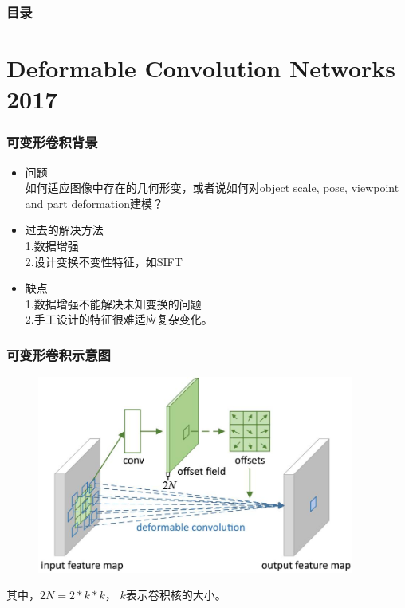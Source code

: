 \documentclass{beamer}
\date{2018 04}
\begin{document}
        \begin{frame}
            \frametitle{目录}
            \tableofcontents
        \end{frame}
        \section{Deformable Convolution Networks 2017}
        \begin{frame}
            \frametitle{可变形卷积背景}
            \begin{itemize}
                \item 问题 \\
                如何适应图像中存在的几何形变，或者说如何对object scale, pose, viewpoint and part deformation建模？
                \item 过去的解决方法 \\
                1.数据增强 \\
                2.设计变换不变性特征，如SIFT
                \item 缺点 \\
                1.数据增强不能解决未知变换的问题 \\
                2.手工设计的特征很难适应复杂变化。
            \end{itemize}
        \end{frame}

        \begin{frame}
            \frametitle{可变形卷积示意图}
            \begin{figure}
                \includegraphics[height=6.5cm]{../graphic/dfconv.jpg}
            \end{figure}
            其中，$2N=2*k*k$， $k$表示卷积核的大小。
        \end{frame}
\end{document}
